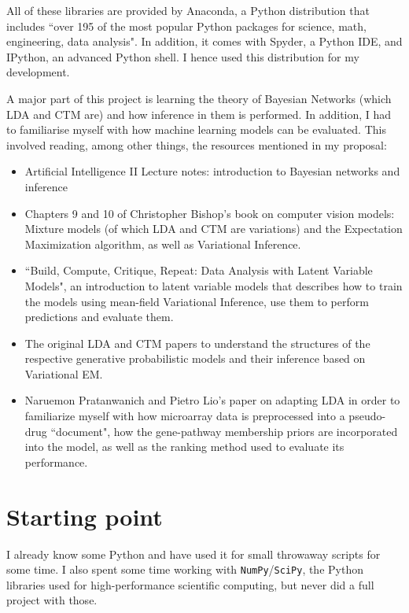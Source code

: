 \documentclass[12pt,a4paper,twoside,openright]{report}
\begin{document}
All of these libraries are provided by Anaconda, a Python distribution that includes ``over 195 of the most popular Python packages for science, math, engineering, data analysis". In addition, it comes with Spyder, a Python IDE, and IPython, an advanced Python shell. I hence used this distribution for my development.

A major part of this project is learning the theory of Bayesian Networks (which LDA and CTM are) and how inference in them is performed. In addition, I had to familiarise myself with how machine learning models can be evaluated. This involved reading, among other things, the resources mentioned in my proposal: 

\begin{itemize}[noitemsep]
\item Artificial Intelligence II Lecture notes: introduction to Bayesian networks and inference
\item Chapters 9 and 10 of Christopher Bishop's book\cite{Bishop:2006:PRM:1162264} on computer vision models: Mixture models (of which LDA and CTM are variations) and the Expectation Maximization algorithm, as well as Variational Inference.
\item ``Build, Compute, Critique, Repeat: Data Analysis with Latent Variable Models"\cite{doi:10.1146/annurev-statistics-022513-115657}, an introduction to latent variable models that describes how to train the models using mean-field Variational Inference, use them to perform predictions and evaluate them.
\item The original LDA\cite{Blei} and CTM\cite{2007} papers to understand the structures of the respective generative probabilistic models and their inference based on Variational EM.
\item Naruemon Pratanwanich and Pietro Lio's paper\cite{Pratanwanich2014}  on adapting LDA in order to familiarize myself with how microarray data is preprocessed into a pseudo-drug ``document", how the gene-pathway membership priors are incorporated into the model, as well as the ranking method used to evaluate its performance.
\end{itemize}

\section{Starting point}

I already know some Python and have used it for small throwaway scripts for some time. I also spent some time working with \texttt{NumPy}/\texttt{SciPy}, the Python libraries used for high-performance scientific computing, but never did a full project with those.
\end{document}

